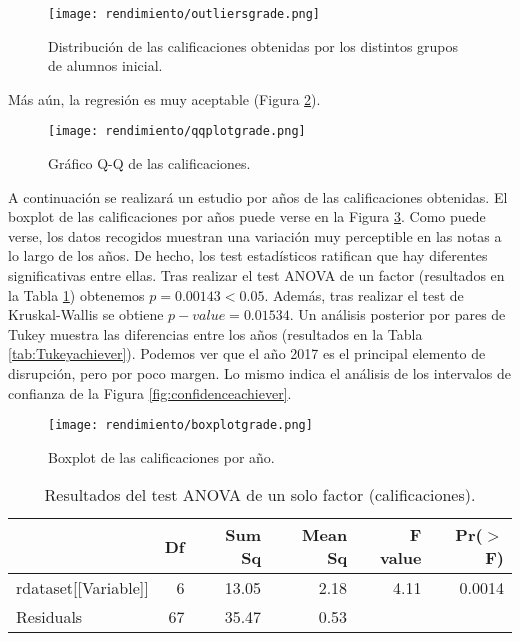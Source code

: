 \begin{figure}[H]
    \centering
    \texttt{[image: rendimiento/outliersgrade.png]}
    \caption{Distribución de las calificaciones obtenidas por los distintos grupos de alumnos inicial.}
    \label{fig:outliersgrade}
\end{figure}

Más aún, la regresión es muy aceptable (Figura \ref{fig:q-qsessionsachiever}).

\begin{figure}[H]
    \centering
    \texttt{[image: rendimiento/qqplotgrade.png]}
    \caption{Gráfico Q-Q de las calificaciones.}
    \label{fig:q-qsessionsachiever}
\end{figure}

A continuación se realizará un estudio por años de las calificaciones obtenidas. El boxplot de las calificaciones por años puede verse en la Figura \ref{fig:boxplotachieveryear}. Como puede verse, los datos recogidos muestran una variación muy perceptible en las notas a lo largo de los años. De hecho, los test estadísticos ratifican que hay diferentes significativas entre ellas. Tras realizar el test ANOVA de un factor (resultados en la Tabla \ref{tab:ANOVAachiever}) obtenemos $p = 0.00143 < 0.05$. Además, tras realizar el test de Kruskal-Wallis se obtiene $p-value = 0.01534$. Un análisis posterior por pares de Tukey muestra las diferencias entre los años (resultados en la Tabla \ref{tab:Tukeyachiever}). Podemos ver que el año 2017 es el principal elemento de disrupción, pero por poco margen. Lo mismo indica el análisis de los intervalos de confianza de la Figura \ref{fig:confidenceachiever}.

\begin{figure}[H]
    \centering
    \texttt{[image: rendimiento/boxplotgrade.png]}
    \caption{Boxplot de las calificaciones por año.}
    \label{fig:boxplotachieveryear}
\end{figure}

\begin{table}[H]
\centering
\caption{Resultados del test ANOVA de un solo factor (calificaciones).}
\label{tab:ANOVAachiever}
\centering
\begin{tabular}{lrrrrr}
  \hline
 & Df & Sum Sq & Mean Sq & F value & Pr($>$F) \\ 
  \hline
rdataset[[Variable]] & 6 & 13.05 & 2.18 & 4.11 & 0.0014 \\ 
  Residuals            & 67 & 35.47 & 0.53 &  &  \\ 
   \hline
\end{tabular}
\end{table}

